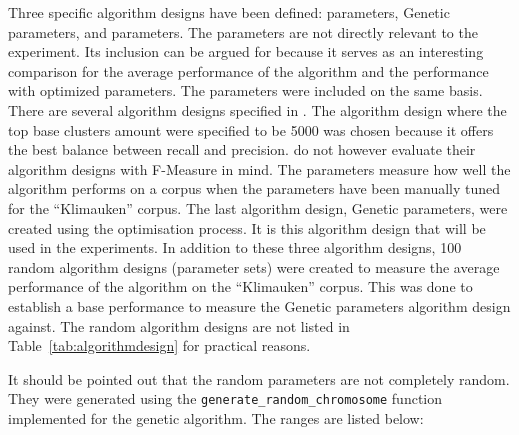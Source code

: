 Three specific algorithm designs have been defined: \citeauthor{Oren1998} parameters, Genetic parameters, and \citeauthor{Moe2013compact} parameters. The \citeauthor{Oren1998} parameters are not directly relevant to the experiment. Its inclusion can be argued for because it serves as an interesting comparison for the average performance of the algorithm and the performance with optimized parameters. The \citeauthor{Moe2013compact} parameters were included on the same basis. There are several algorithm designs specified in \cite{Moe2013compact}. The algorithm design where the top base clusters amount were specified to be 5000 was chosen because it offers the best balance between recall and precision. \citeauthor{Moe2013compact} do not however evaluate their algorithm designs with F-Measure in mind. The \citeauthor{Moe2013compact} parameters measure how well the algorithm performs on a corpus when the parameters have been manually tuned for the ``Klimauken'' corpus. The last algorithm design, Genetic parameters, were created using the \GA optimisation process. It is this algorithm design that will be used in the experiments. In addition to these three algorithm designs, 100 random algorithm designs (parameter sets) were created to measure the average performance of the \CTC algorithm on the ``Klimauken'' corpus. This was done to establish a base performance to measure the Genetic parameters algorithm design against. The random algorithm designs are not listed in Table~\ref{tab:algorithmdesign} for practical reasons.

It should be pointed out that the random parameters are not completely random. They were generated using the \texttt{generate\_random\_chromosome} function implemented for the genetic algorithm. The ranges are listed below:

